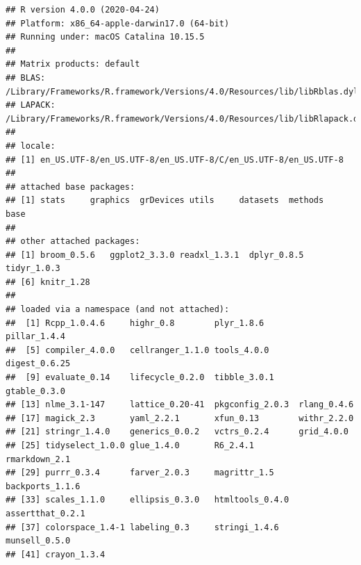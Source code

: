 \documentclass[]{article}
\begin{document}
\begin{verbatim}
## R version 4.0.0 (2020-04-24)
## Platform: x86_64-apple-darwin17.0 (64-bit)
## Running under: macOS Catalina 10.15.5
## 
## Matrix products: default
## BLAS:   /Library/Frameworks/R.framework/Versions/4.0/Resources/lib/libRblas.dylib
## LAPACK: /Library/Frameworks/R.framework/Versions/4.0/Resources/lib/libRlapack.dylib
## 
## locale:
## [1] en_US.UTF-8/en_US.UTF-8/en_US.UTF-8/C/en_US.UTF-8/en_US.UTF-8
## 
## attached base packages:
## [1] stats     graphics  grDevices utils     datasets  methods   base     
## 
## other attached packages:
## [1] broom_0.5.6   ggplot2_3.3.0 readxl_1.3.1  dplyr_0.8.5   tidyr_1.0.3  
## [6] knitr_1.28   
## 
## loaded via a namespace (and not attached):
##  [1] Rcpp_1.0.4.6     highr_0.8        plyr_1.8.6       pillar_1.4.4    
##  [5] compiler_4.0.0   cellranger_1.1.0 tools_4.0.0      digest_0.6.25   
##  [9] evaluate_0.14    lifecycle_0.2.0  tibble_3.0.1     gtable_0.3.0    
## [13] nlme_3.1-147     lattice_0.20-41  pkgconfig_2.0.3  rlang_0.4.6     
## [17] magick_2.3       yaml_2.2.1       xfun_0.13        withr_2.2.0     
## [21] stringr_1.4.0    generics_0.0.2   vctrs_0.2.4      grid_4.0.0      
## [25] tidyselect_1.0.0 glue_1.4.0       R6_2.4.1         rmarkdown_2.1   
## [29] purrr_0.3.4      farver_2.0.3     magrittr_1.5     backports_1.1.6 
## [33] scales_1.1.0     ellipsis_0.3.0   htmltools_0.4.0  assertthat_0.2.1
## [37] colorspace_1.4-1 labeling_0.3     stringi_1.4.6    munsell_0.5.0   
## [41] crayon_1.3.4
\end{verbatim}
\end{document}
